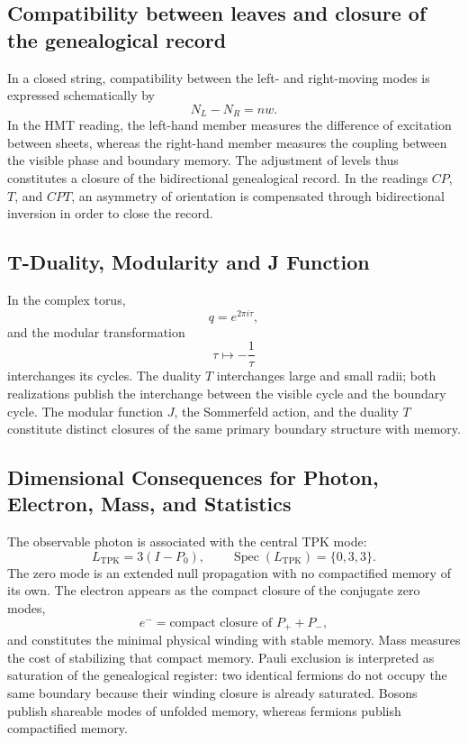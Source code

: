 \subsection{Compatibility between leaves and closure of the genealogical record}

In a closed string, compatibility between the left- and right-moving modes
is expressed schematically by
\[
N_L-N_R=nw.
\]
In the HMT reading, the left-hand member measures the difference of excitation
between sheets, whereas the right-hand member measures the coupling between the visible phase and
boundary memory. The adjustment of levels thus constitutes a closure of the
bidirectional genealogical record. In the readings \(CP\), \(T\), and \(CPT\), an asymmetry
of orientation is compensated through bidirectional inversion in order to close the
record.

\subsection{T-Duality, Modularity and J Function}

In the complex torus,
\[
q=e^{2\pi i\tau},
\]
and the modular transformation
\[
\tau\longmapsto-\frac1\tau
\]
interchanges its cycles. The duality \(T\) interchanges large and small radii; both realizations publish the interchange between the visible cycle and the boundary cycle. The modular function \(J\), the Sommerfeld action, and the duality \(T\) constitute distinct closures of the same primary boundary structure with memory.

\subsection{Dimensional Consequences for Photon, Electron, Mass, and Statistics}

The observable photon is associated with the central TPK mode:
\[
L_{\mathrm{TPK}}=3(I-P_0),
\qquad
\operatorname{Spec}(L_{\mathrm{TPK}})=\{0,3,3\}.
\]
The zero mode is an extended null propagation with no compactified memory
of its own. The electron appears as the compact closure of the conjugate
zero modes,
\[
e^-=\text{compact closure of }P_++P_-,
\]
and constitutes the minimal physical winding with stable memory. Mass
measures the cost of stabilizing that compact memory. Pauli
exclusion is interpreted as saturation of the genealogical register: two identical fermions do not
occupy the same boundary because their winding closure is already saturated.
Bosons publish shareable modes of unfolded memory, whereas
fermions publish compactified memory.

